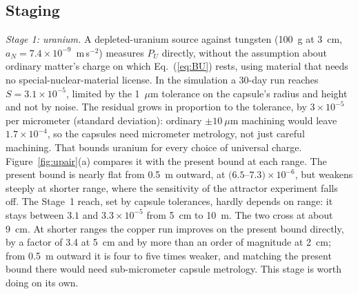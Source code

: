 \documentclass[aps,prd,onecolumn,superscriptaddress,floatfix,nofootinbib]{revtex4-2}
\begin{document}
\subsection{Staging}\label{sec:stage}

\textit{Stage 1: uranium.} A depleted-uranium source against tungsten (100~g at 3~cm,
$a_N=7.4\times10^{-9}$~m\,s$^{-2}$) measures $P_U$ directly, without the assumption about ordinary matter's charge
on which Eq.~(\ref{eq:BU}) rests, using material that needs no special-nuclear-material license. In the simulation
a 30-day run reaches $S=3.1\times10^{-5}$, limited by the 1~$\mu$m tolerance on the capsule's radius and height and
not by noise. The residual grows in proportion to the tolerance, by $3\times10^{-5}$ per micrometer (standard
deviation): ordinary $\pm10~\mu$m machining would leave $1.7\times10^{-4}$, so the capsules need micrometer
metrology, not just careful machining. That bounds uranium for
every choice of universal charge. Figure~\ref{fig:upair}(a) compares it with the present bound at each range. The
present bound is nearly flat from 0.5~m outward, at $(6.5$--$7.3)\times10^{-6}$, but weakens steeply at shorter
range, where the sensitivity of the attractor experiment falls off. The Stage~1 reach, set by capsule tolerances,
hardly depends on range: it stays between $3.1$ and $3.3\times10^{-5}$ from 5~cm to 10~m. The two cross at about
9~cm. At shorter ranges the copper run improves on the present bound directly, by a factor of 3.4 at 5~cm and by
more than an order of magnitude at 2~cm; from 0.5~m outward it is four to five times weaker, and matching the present
bound there would need sub-micrometer capsule metrology. This stage is worth doing on its own.
\end{document}
